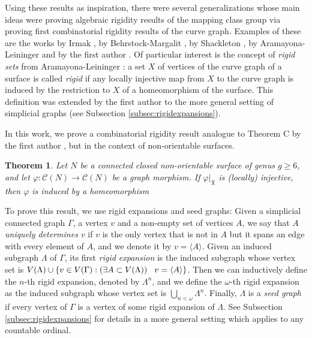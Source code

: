 \documentclass{artv3}
\newtheorem{Theo}{Theorem}
\newcommand*{\cg}[1]{\mathcal{C}(#1)}
\newcommand*{\X}{\mathfrak{X}}
\begin{document}
Using these results as inspiration, there were several generalizations whose main ideas were proving algebraic rigidity results of the mapping class group via proving first combinatorial rigidity results of the curve graph. Examples of these are the works by Irmak \cite{Irmak2004} \cite{Irmak2012} \cite{Irmak2020}, by Behrstock-Margalit \cite{BM06}, by Shackleton \cite{Shackleton2007}, by Aramayona-Leininger \cite{AL13} \cite{AL16} and by the first author \cite{JHH1} \cite{JHH2} \cite{JHH3}. Of particular interest is the concept of \emph{rigid sets} from Aramayona-Leininger \cite{AL13} : a set $X$ of vertices of the curve graph of a surface is called \emph{rigid} if any locally injective map from $X$ to the curve graph is induced by the restriction to $X$ of a homeomorphism of the surface. This definition was extended by the first author \cite{JHH2} to the more general setting of simplicial graphs (see Subsection \ref{subsec:rigidexpansions}).

In this work, we prove a combinatorial rigidity result analogue to Theorem C by the first author \cite{JHH3}, but in the context of non-orientable surfaces.

\begin{Theo}\label{thm:combrigid}
    Let $N$ be a connected closed non-orientable surface of genus $g \geq 6$, and let $\varphi: \cg{N} \to \cg{N}$ be a graph morphism. If $\varphi|_{\X}$ is (locally) injective, then $\varphi$ is induced by a homeomorphism
\end{Theo}

To prove this result, we use rigid expansions and seed graphs: Given a simplicial connected graph $\Gamma$, a vertex $v$ and a non-empty set of vertices $A$, we say that \emph{$A$ uniquely determines $v$} if $v$ is the only vertex that is not in $A$ but it spans an edge with every element of $A$, and we denote it by $v = \langle A \rangle$. Given an induced subgraph $\Lambda$ of $\Gamma$, its first \emph{rigid expansion} is the induced subgraph whose vertex set is $V(\Lambda) \cup \{v \in V(\Gamma) : (\exists A \subset V(\Lambda)) \hspace{3mm} v = \langle A \rangle\}$. Then we can inductively define the $n$-th rigid expansion, denoted by $\Lambda^{n}$, and we define the $\omega$-th rigid expansion as the induced subgraph whose vertex set is $\bigcup_{n < \omega} \Lambda^{n}$. Finally, $\Lambda$ is a \emph{seed graph} if every vertex of $\Gamma$ is a vertex of some rigid expansion of $\Lambda$. See Subsection \ref{subsec:rigidexpansions} for details in a more general setting which applies to any countable ordinal.
\end{document}
